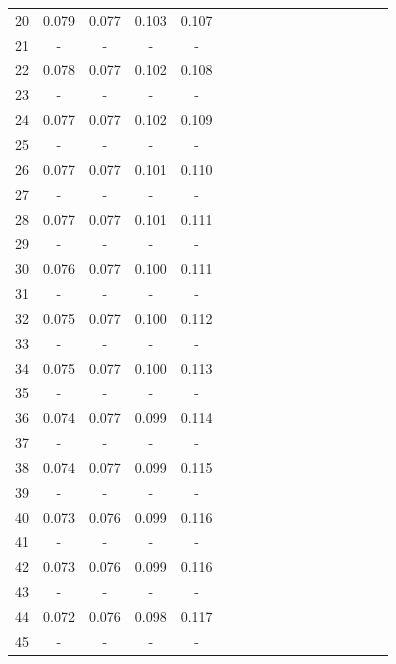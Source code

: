 \documentclass{report}
\begin{document}
\begin{appendices}
\begin{table}
\begin{tabular}{|c|cccc|cccc|cccc|cccc|}
20 & 0.079 & 0.077 & 0.103 & 0.107 & & & & & & & & & & & &\\
21 &   -   &   -   &   -   &   -   & & & & & & & & & & & &\\
22 & 0.078 & 0.077 & 0.102 & 0.108 & & & & & & & & & & & &\\
23 &   -   &   -   &   -   &   -   & & & & & & & & & & & &\\
24 & 0.077 & 0.077 & 0.102 & 0.109 & & & & & & & & & & & &\\
25 &   -   &   -   &   -   &   -   & & & & & & & & & & & &\\
26 & 0.077 & 0.077 & 0.101 & 0.110 & & & & & & & & & & & &\\
27 &   -   &   -   &   -   &   -   & & & & & & & & & & & &\\
28 & 0.077 & 0.077 & 0.101 & 0.111 & & & & & & & & & & & &\\
29 &   -   &   -   &   -   &   -   & & & & & & & & & & & &\\
30 & 0.076 & 0.077 & 0.100 & 0.111 & & & & & & & & & & & &\\
31 &   -   &   -   &   -   &   -   & & & & & & & & & & & &\\
32 & 0.075 & 0.077 & 0.100 & 0.112 & & & & & & & & & & & &\\
33 &   -   &   -   &   -   &   -   & & & & & & & & & & & &\\
34 & 0.075 & 0.077 & 0.100 & 0.113 & & & & & & & & & & & &\\
35 &   -   &   -   &   -   &   -   & & & & & & & & & & & &\\
36 & 0.074 & 0.077 & 0.099 & 0.114 & & & & & & & & & & & &\\
37 &   -   &   -   &   -   &   -   & & & & & & & & & & & &\\
38 & 0.074 & 0.077 & 0.099 & 0.115 & & & & & & & & & & & &\\
39 &   -   &   -   &   -   &   -   & & & & & & & & & & & &\\
40 & 0.073 & 0.076 & 0.099 & 0.116 & & & & & & & & & & & &\\
41 &   -   &   -   &   -   &   -   & & & & & & & & & & & &\\
42 & 0.073 & 0.076 & 0.099 & 0.116 & & & & & & & & & & & &\\
43 &   -   &   -   &   -   &   -   & & & & & & & & & & & &\\
44 & 0.072 & 0.076 & 0.098 & 0.117 & & & & & & & & & & & &\\
45 &   -   &   -   &   -   &   -   & & & & & & & & & & & &\\

\end{tabular}
\end{table}
\end{appendices}
\end{document}
